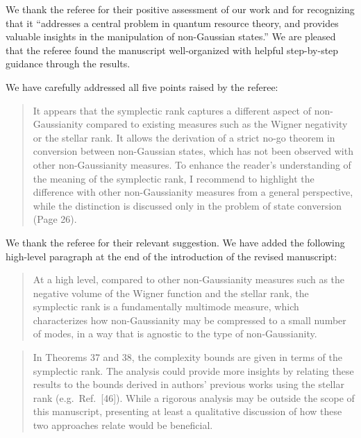\documentclass[a4paper,12pt]{article}
\newenvironment{Referee}[1]
{\noindent {\bf Comment #1:} \begin{quote} }
{\end{quote}\vspace{0 cm}}
\newenvironment{Response}
{\noindent \color{RawSienna}{\bf Response:} }
{\vspace{0.4 cm}}
\begin{document}
We thank the referee for their positive assessment of our work and for recognizing that it ``addresses a central problem in quantum resource theory, and provides valuable insights in the manipulation of non-Gaussian states.'' We are pleased that the referee found the manuscript well-organized with helpful step-by-step guidance through the results.

We have carefully addressed all five points raised by the referee:


\begin{Referee}{1}
It appears that the symplectic rank captures a different aspect of non-Gaussianity compared to existing measures such as the Wigner negativity or the stellar rank. It allows the derivation of a strict no-go theorem in conversion between non-Gaussian states, which has not been observed with other non-Gaussianity measures. To enhance the reader's understanding of the meaning of the symplectic rank, I recommend to highlight the difference with other non-Gaussianity measures from a general perspective, while the distinction is discussed only in the problem of state conversion (Page 26).
\end{Referee}

\begin{Response}
We thank the referee for their relevant suggestion. We have added the following high-level paragraph at the end of the introduction of the revised manuscript:
\begin{quote}
    At a high level, compared to other non-Gaussianity measures such as the negative volume of the Wigner function and the stellar rank, the symplectic rank is a fundamentally multimode measure, which characterizes how non-Gaussianity may be compressed to a small number of modes, in a way that is agnostic to the type of non-Gaussianity.
\end{quote}
\end{Response}

\begin{Referee}{2}
In Theorems 37 and 38, the complexity bounds are given in terms of the symplectic rank. The analysis could provide more insights by relating these results to the bounds derived in authors' previous works using the stellar rank (e.g.\ Ref.\ [46]). While a rigorous analysis may be outside the scope of this manuscript, presenting at least a qualitative discussion of how these two approaches relate would be beneficial.
\end{Referee}
\end{document}
